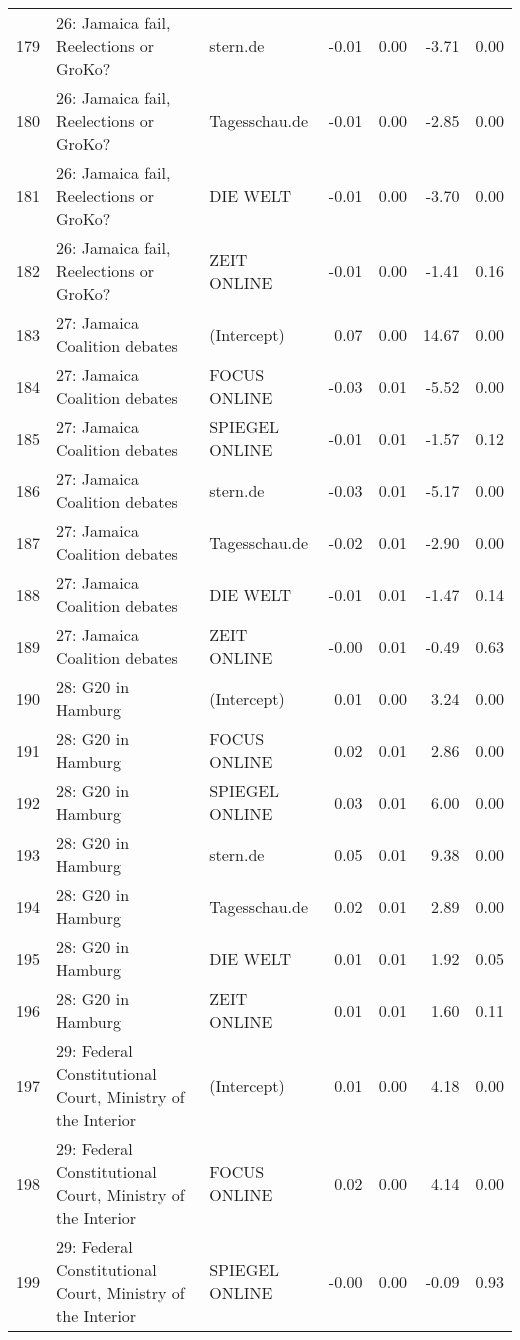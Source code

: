 \begin{table}[ht]
{\begin{tabular}{rllrrrr}
  179 & 26: Jamaica fail, Reelections or GroKo? & stern.de & -0.01 & 0.00 & -3.71 & 0.00 \\ 
  180 & 26: Jamaica fail, Reelections or GroKo? & Tagesschau.de & -0.01 & 0.00 & -2.85 & 0.00 \\ 
  181 & 26: Jamaica fail, Reelections or GroKo? & DIE WELT & -0.01 & 0.00 & -3.70 & 0.00 \\ 
  182 & 26: Jamaica fail, Reelections or GroKo? & ZEIT ONLINE & -0.01 & 0.00 & -1.41 & 0.16 \\ 
  183 & 27: Jamaica Coalition debates & (Intercept) & 0.07 & 0.00 & 14.67 & 0.00 \\ 
  184 & 27: Jamaica Coalition debates & FOCUS ONLINE & -0.03 & 0.01 & -5.52 & 0.00 \\ 
  185 & 27: Jamaica Coalition debates & SPIEGEL ONLINE & -0.01 & 0.01 & -1.57 & 0.12 \\ 
  186 & 27: Jamaica Coalition debates & stern.de & -0.03 & 0.01 & -5.17 & 0.00 \\ 
  187 & 27: Jamaica Coalition debates & Tagesschau.de & -0.02 & 0.01 & -2.90 & 0.00 \\ 
  188 & 27: Jamaica Coalition debates & DIE WELT & -0.01 & 0.01 & -1.47 & 0.14 \\ 
  189 & 27: Jamaica Coalition debates & ZEIT ONLINE & -0.00 & 0.01 & -0.49 & 0.63 \\ 
  190 & 28: G20 in Hamburg & (Intercept) & 0.01 & 0.00 & 3.24 & 0.00 \\ 
  191 & 28: G20 in Hamburg & FOCUS ONLINE & 0.02 & 0.01 & 2.86 & 0.00 \\ 
  192 & 28: G20 in Hamburg & SPIEGEL ONLINE & 0.03 & 0.01 & 6.00 & 0.00 \\ 
  193 & 28: G20 in Hamburg & stern.de & 0.05 & 0.01 & 9.38 & 0.00 \\ 
  194 & 28: G20 in Hamburg & Tagesschau.de & 0.02 & 0.01 & 2.89 & 0.00 \\ 
  195 & 28: G20 in Hamburg & DIE WELT & 0.01 & 0.01 & 1.92 & 0.05 \\ 
  196 & 28: G20 in Hamburg & ZEIT ONLINE & 0.01 & 0.01 & 1.60 & 0.11 \\ 
  197 & 29: Federal Constitutional Court, Ministry of the Interior & (Intercept) & 0.01 & 0.00 & 4.18 & 0.00 \\ 
  198 & 29: Federal Constitutional Court, Ministry of the Interior & FOCUS ONLINE & 0.02 & 0.00 & 4.14 & 0.00 \\ 
  199 & 29: Federal Constitutional Court, Ministry of the Interior & SPIEGEL ONLINE & -0.00 & 0.00 & -0.09 & 0.93 \\ 

\end{tabular}}
\end{table}
